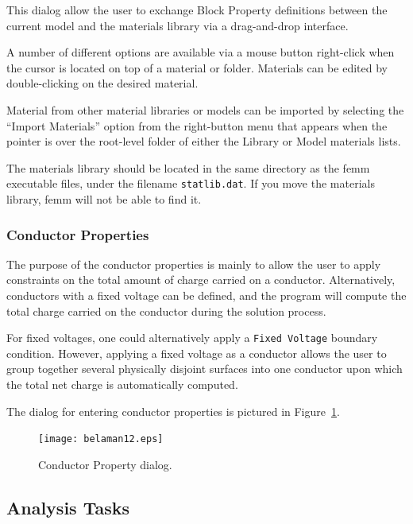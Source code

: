 \documentclass[12pt]{report}
\begin{document}
This dialog allow the user to exchange Block
Property definitions between the current model and the materials
library via a drag-and-drop interface.

A number of different options are available via a mouse button right-click
when the cursor is located on top of a material or folder. Materials can be edited
by double-clicking on the desired material.

Material from other material libraries or models can be imported by selecting the
``Import Materials'' option from the right-button menu that appears when the pointer
is over the root-level folder of either the Library or Model materials lists.

The materials library should be located in the same directory as
the femm executable files, under the filename \texttt{statlib.dat}.
If you move the materials library, femm will not be able to find
it.

\subsubsection{Conductor Properties}

The purpose of the conductor properties is mainly to allow the user to apply
constraints on the total amount of charge carried on a conductor.
Alternatively, conductors with a fixed voltage can be defined, and the
program will compute the total charge carried on the conductor during the
solution process.





For fixed voltages, one could alternatively apply a \texttt{Fixed
Voltage} boundary condition. However, applying a fixed voltage as a
conductor allows the user to group together several physically
disjoint surfaces into one conductor upon which the total net
charge is automatically computed.





The dialog for entering conductor properties is pictured in
Figure~\ref{fig12}.

\begin{figure}[htbp]
\centerline{\texttt{[image: belaman12.eps]}}
\caption{Conductor Property dialog.}
\label{fig12}
\end{figure}

\subsection{Analysis Tasks}
\end{document}

